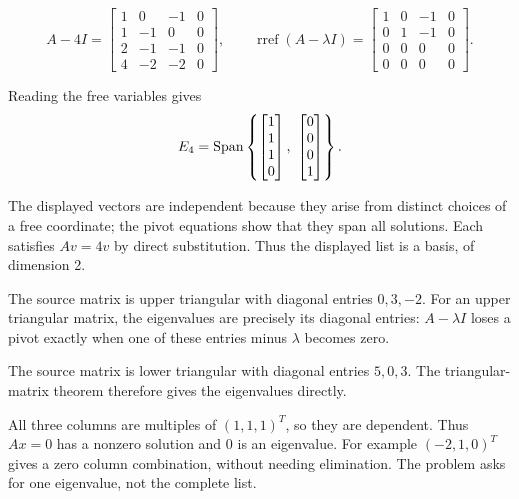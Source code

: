 \[ A-4I=\begin{bmatrix}1 & 0 & -1 & 0\\1 & -1 & 0 & 0\\2 & -1 & -1 & 0\\4 & -2 & -2 & 0\end{bmatrix},\qquad\operatorname{rref}(A-\lambda I)=\begin{bmatrix}1 & 0 & -1 & 0\\0 & 1 & -1 & 0\\0 & 0 & 0 & 0\\0 & 0 & 0 & 0\end{bmatrix}.\]

Reading the free variables gives
\[ E_{4}=\Span\left\{\begin{bmatrix}1\\1\\1\\0\end{bmatrix},\ \begin{bmatrix}0\\0\\0\\1\end{bmatrix}\right\}.\]

The displayed vectors are independent because they arise from distinct choices of a free coordinate; the pivot equations show that they span all solutions. Each satisfies $Av=4v$ by direct substitution. Thus the displayed list is a basis, of dimension 2.


The source matrix is upper triangular with diagonal entries $0,3,-2$.
For an upper triangular matrix, the eigenvalues are precisely its diagonal
entries: $A-\lambda I$ loses a pivot exactly when one of these
entries minus $\lambda$ becomes zero.

The source matrix is lower triangular with diagonal entries $5,0,3$.
The triangular-matrix theorem therefore gives the eigenvalues directly.

All three columns are multiples of $(1,1,1)^T$, so they are dependent.
Thus $Ax=0$ has a nonzero solution and $0$ is an eigenvalue.
For example $(-2,1,0)^T$ gives a zero column combination, without
needing elimination. The problem asks for one eigenvalue, not the complete list.

